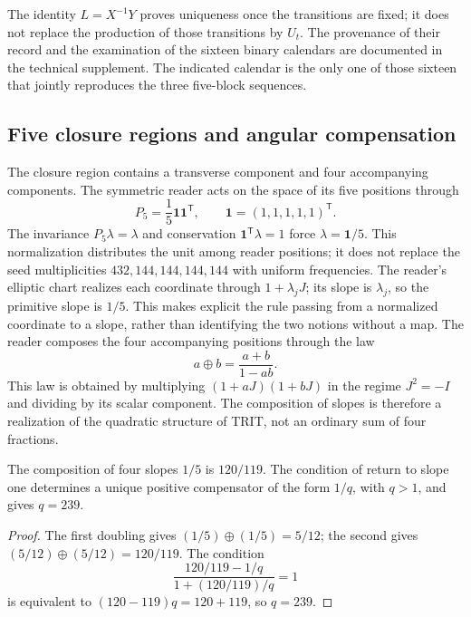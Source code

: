 The identity \(L=X^{-1}Y\) proves uniqueness once the transitions are fixed; it does not replace the production of those transitions by \(U_t\). The provenance of their record and the examination of the sixteen binary calendars are documented in the technical supplement. The indicated calendar is the only one of those sixteen that jointly reproduces the three five-block sequences.

\subsection{Five closure regions and angular compensation}

The closure region contains a transverse component and four accompanying components. The symmetric reader acts on the space of its five positions through
\[
 P_5=\frac15\mathbf1\mathbf1^{\mathsf T},\qquad
 \mathbf1=(1,1,1,1,1)^{\mathsf T}.
\]
The invariance \(P_5\lambda=\lambda\) and conservation \(\mathbf1^{\mathsf T}\lambda=1\) force \(\lambda=\mathbf1/5\). This normalization distributes the unit among reader positions; it does not replace the seed multiplicities \(432,144,144,144,144\) with uniform frequencies. The reader's elliptic chart realizes each coordinate through \(1+\lambda_jJ\); its slope is \(\lambda_j\), so the primitive slope is \(1/5\). This makes explicit the rule passing from a normalized coordinate to a slope, rather than identifying the two notions without a map. The reader composes the four accompanying positions through the law
\begin{equation}
 a\oplus b=\frac{a+b}{1-ab}.
 \label{eq:suma-pendientes}
\end{equation}
This law is obtained by multiplying \((1+aJ)(1+bJ)\) in the regime \(J^2=-I\) and dividing by its scalar component. The composition of slopes is therefore a realization of the quadratic structure of TRIT, not an ordinary sum of four fractions.

\begin{proposition}
The composition of four slopes \(1/5\) is \(120/119\). The condition of return to slope one determines a unique positive compensator of the form \(1/q\), with \(q>1\), and gives \(q=239\).
\end{proposition}
\begin{proof}
The first doubling gives \((1/5)\oplus(1/5)=5/12\); the second gives \((5/12)\oplus(5/12)=120/119\). The condition
\[
 \frac{120/119-1/q}{1+(120/119)/q}=1
\]
is equivalent to \((120-119)q=120+119\), so \(q=239\).
\end{proof}

